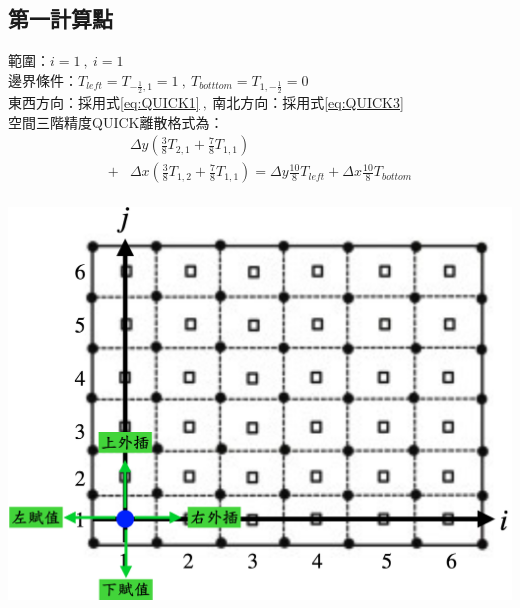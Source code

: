 \documentclass[12pt]{article}
\begin{document}
\subsection{第一計算點}
 \begin{minipage}{0.6\textwidth}
   \noindent 範圍：$i=1\ ,\ i=1$\\[1.5ex]
   \noindent 邊界條件：$T_{left} = T_{-\frac{1}{2},1}= 1\ ,\ T_{botttom} = T_{1,-\frac{1}{2}}= 0$\\[1.5ex]
   \noindent 東西方向：採用式\eqref{eq:QUICK1}$\ ,\ $南北方向：採用式\eqref{eq:QUICK3}\\[1.5ex]
   \noindent 空間三階精度QUICK離散格式為：
   \begin{equation*}\begin{split}
    &\Delta y(\frac{3}{8}T_{2,1} + \frac{7}{8}T_{1,1})\\[1.5ex]
   +&\Delta x (\frac{3}{8}T_{1,2} + \frac{7}{8}T_{1,1} ) = \Delta y\frac{10}{8}T_{left}+\Delta x\frac{10}{8}T_{bottom} \\[1.5ex]
   \end{split}\end{equation*}
   \end{minipage}%
   \hfill
   \begin{minipage}{0.34\textwidth}
   \centering
   \includegraphics[width=\linewidth,height=9\baselineskip]{20.png}
   \label{fig:1st point}
\end{minipage}
\end{document}
